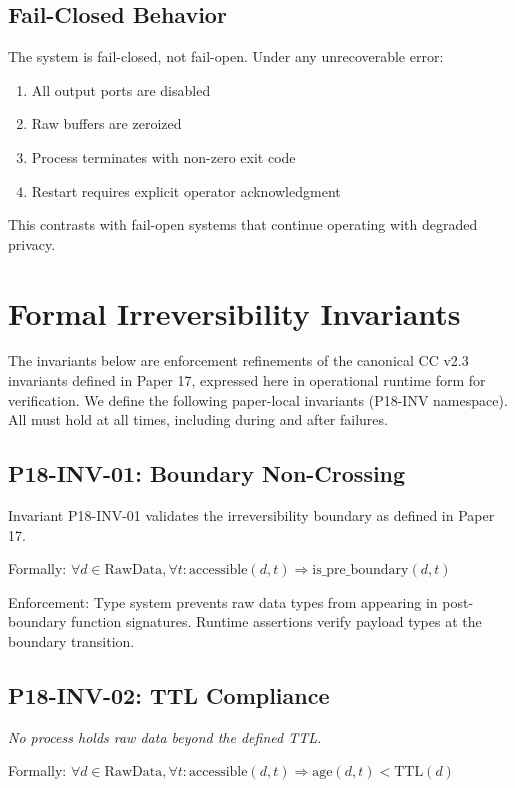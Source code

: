 \documentclass[conference]{IEEEtran}
\begin{document}
\subsection{Fail-Closed Behavior}
The system is fail-closed, not fail-open. Under any unrecoverable error:
\begin{enumerate}
    \item All output ports are disabled
    \item Raw buffers are zeroized
    \item Process terminates with non-zero exit code
    \item Restart requires explicit operator acknowledgment
\end{enumerate}

This contrasts with fail-open systems that continue operating with degraded privacy.

\section{Formal Irreversibility Invariants}
The invariants below are enforcement refinements of the canonical CC v2.3 invariants defined in Paper 17, expressed here in operational runtime form for verification. We define the following paper-local invariants (P18-INV namespace). All must hold at all times, including during and after failures.

\subsection{P18-INV-01: Boundary Non-Crossing}
Invariant P18-INV-01 validates the irreversibility boundary as defined in Paper 17.

Formally: $\forall d \in \text{RawData}, \forall t: \text{accessible}(d, t) \Rightarrow \text{is\_pre\_boundary}(d, t)$

Enforcement: Type system prevents raw data types from appearing in post-boundary function signatures. Runtime assertions verify payload types at the boundary transition.

\subsection{P18-INV-02: TTL Compliance}
\textit{No process holds raw data beyond the defined TTL.}

Formally: $\forall d \in \text{RawData}, \forall t: \text{accessible}(d, t) \Rightarrow \text{age}(d, t) < \text{TTL}(d)$
\end{document}
